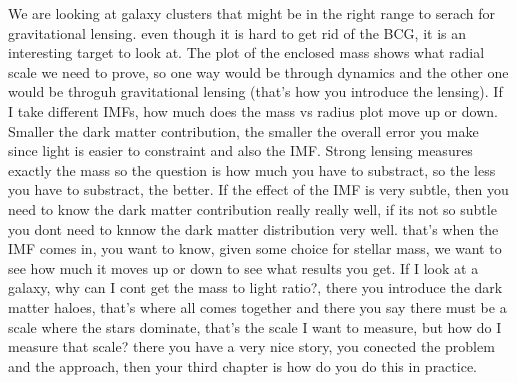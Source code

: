 We are looking at galaxy clusters that might be in the right range to serach for gravitational lensing. even though it is hard to get rid of the BCG, it is an interesting target to look at. The plot of the enclosed mass shows what radial scale we need to prove, so one way would be through dynamics and the other one would be throguh gravitational lensing (that's how you introduce the lensing). If I take different IMFs, how much does the mass vs radius plot move up or down. Smaller the dark matter contribution, the smaller the overall error you make since light is easier to constraint and also the IMF. Strong lensing measures exactly the mass so the question is how much you have to substract, so the less you have to substract, the better. If the effect of the IMF is very subtle, then you need to know the dark matter contribution really really well, if its not so subtle you dont need to knnow the dark matter distribution very well. that's when the IMF comes in, you want to know, given some choice for stellar mass, we want to see how much it moves up or down to see what results you get. If I look at a galaxy, why can I cont get the mass to light ratio?, there you introduce the dark matter haloes, that's where all comes together and there you say there must be a scale where the stars dominate, that's the scale I want to measure, but how do I measure that scale? there you have a very nice story, you conected the problem and the approach, then your third chapter is how do you do this in practice. 


\newpage
